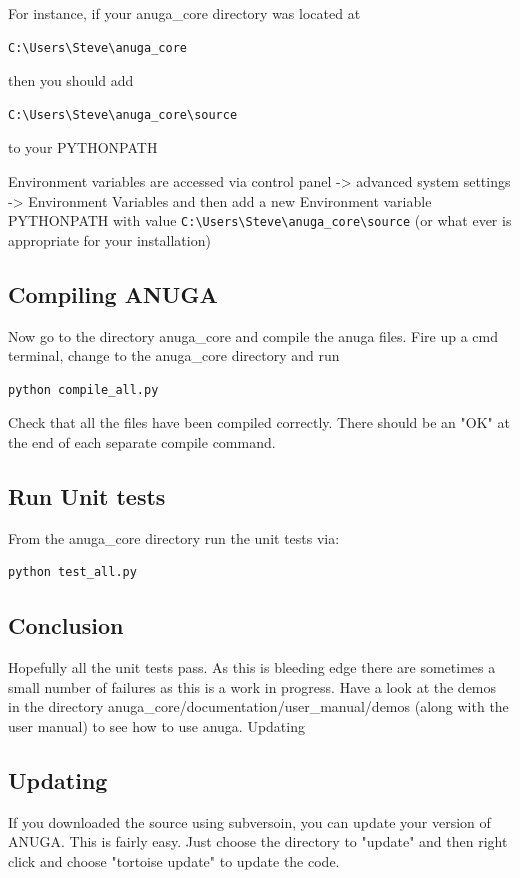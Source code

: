 \documentclass{manual}
\begin{document}
For instance, if your anuga_core directory was located at

\begin{verbatim}
C:\Users\Steve\anuga_core
\end{verbatim}

then you should add

\begin{verbatim}
C:\Users\Steve\anuga_core\source
\end{verbatim}

to your PYTHONPATH

Environment variables are accessed via control panel -> advanced system settings -> Environment Variables and then add a new Environment variable PYTHONPATH with value \verb|C:\Users\Steve\anuga_core\source| (or what ever is appropriate for your installation)

\subsection{Compiling ANUGA}

Now go to the directory anuga_core and compile the anuga files. Fire up a cmd terminal, change to the anuga_core directory and run
\begin{verbatim}
python compile_all.py
\end{verbatim}
Check that all the files have been compiled correctly. There should be an "OK" at the end of each separate compile command.

\subsection{Run Unit tests}

From the anuga_core directory run the unit tests via:
\begin{verbatim}
python test_all.py
\end{verbatim}

\subsection{Conclusion}

Hopefully all the unit tests pass. As this is bleeding edge there are sometimes a small number of failures as this is a work in progress. Have a look at the demos in the directory anuga_core/documentation/user_manual/demos (along with the user manual) to see how to use anuga.
Updating

\subsection{Updating}
If you downloaded  the source using subversoin, you can update your version of ANUGA. 
 This is fairly easy. Just choose the directory to "update" and then right click and choose "tortoise update" to update the code.
\end{document}
